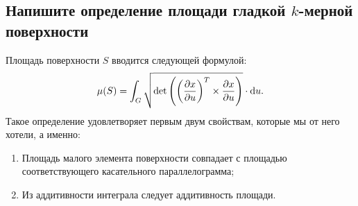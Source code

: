 
\subsection{Напишите определение площади гладкой $k$-мерной поверхности}

Площадь поверхности $S$ вводится следующей формулой:
\[
    \mu(S) = \int_{G} \sqrt{\det\pqty{\pqty{\pdv{x}{u}}^{T} \times \pdv{x}{u}}} \cdot \dd u.
\]
Такое определение удовлетворяет первым двум свойствам, которые мы от него хотели, а именно:
\begin{enumerate}
    \item Площадь малого элемента поверхности совпадает с площадью соответствующего касательного параллелограмма;
    \item Из аддитивности интеграла следует аддитивность площади.
\end{enumerate}
